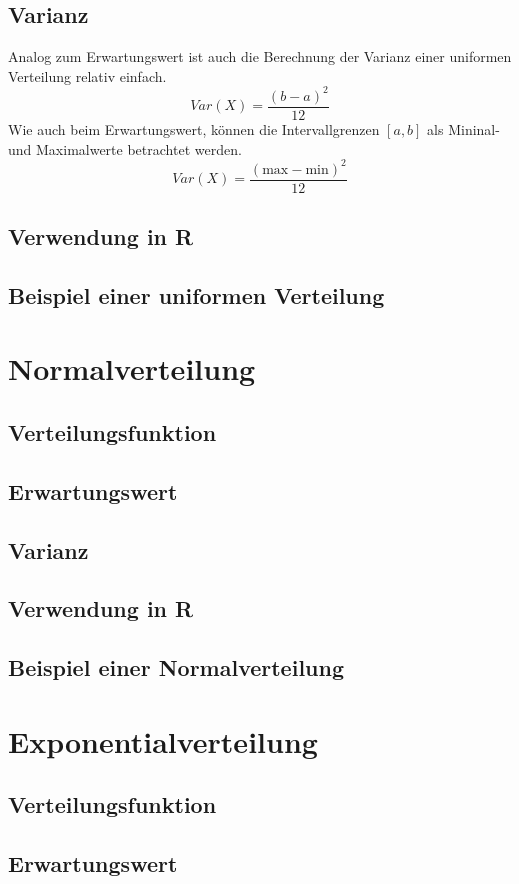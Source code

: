\subsection{Varianz}
Analog zum Erwartungswert ist auch die Berechnung der Varianz
einer uniformen Verteilung relativ einfach.
\[ 
	Var(X) = \frac{(b - a)^2}{12}
\]
Wie auch beim Erwartungswert, können die Intervallgrenzen
$[a,b]$ als Mininal- und Maximalwerte betrachtet werden.
\[  
	Var(X) = \frac{(\text{max} - \text{min})^2}{12}
\]

\subsection{Verwendung in R}
\subsection{Beispiel einer uniformen Verteilung}

\newpage
\section{Normalverteilung}
\subsection{Verteilungsfunktion}
\subsection{Erwartungswert}
\subsection{Varianz}
\subsection{Verwendung in R}
\subsection{Beispiel einer Normalverteilung}

\newpage
\section{Exponentialverteilung}
\subsection{Verteilungsfunktion}
\subsection{Erwartungswert}
